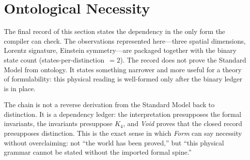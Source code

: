 \documentclass[11pt,a4paper]{book}
\def\texttt#1{#1}%
\begin{document}

\section{Ontological Necessity}
\label{sec:ontological-necessity}

The final record of this section states the dependency in the only form the compiler can check. The observations represented here---three spatial dimensions, Lorentz signature, Einstein symmetry---are packaged together with the binary state count (\texttt{states-per-distinction}~$= 2$). The record does not prove the Standard Model from ontology. It states something narrower and more useful for a theory of formulability: this physical reading is well-formed only after the binary ledger is in place.

The chain is not a reverse derivation from the Standard Model back to distinction. It is a dependency ledger: the interpretation presupposes the formal invariants, the invariants presuppose $K_4$, and \textit{Void} proves that the closed record presupposes distinction. This is the exact sense in which \emph{Form} can say necessity without overclaiming: not ``the world has been proved,'' but ``this physical grammar cannot be stated without the imported formal spine.''
\end{document}
